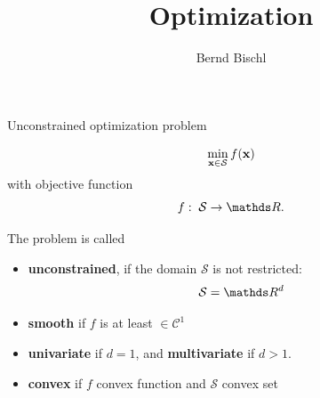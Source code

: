 





\newcommand{\titlefigure}{figure_man/ml_linreg_example_2.pdf}
\newcommand{\learninggoals}{
\item Definition
\item Max. Likelihood 
\item Normal regression
\item Risk Minimization
}



\title{Optimization}
\author{Bernd Bischl}
\date{}



\sloppy

\begin{vbframe}{Unconstrained optimization problem}

$$
\min_{\mathbf{x} \in \mathcal{S}} f(\mathbf{x})
$$
with objective function
$$
f: \; \mathcal{S} \to \R.
$$

\lz 

The problem is called

\begin{itemize}
	\item \textbf{unconstrained}, if the domain $\mathcal{S}$ is not restricted: 
	$$
		\mathcal{S} = \R^d
	$$
	\item \textbf{smooth} if $f$ is at least $\in \mathcal{C}^1$
	\item \textbf{univariate} if $d = 1$, and \textbf{multivariate} if $d > 1$.  
	\item \textbf{convex} if $f$ convex function and $\mathcal{S}$ convex set
\end{itemize}

\end{vbframe}


	

